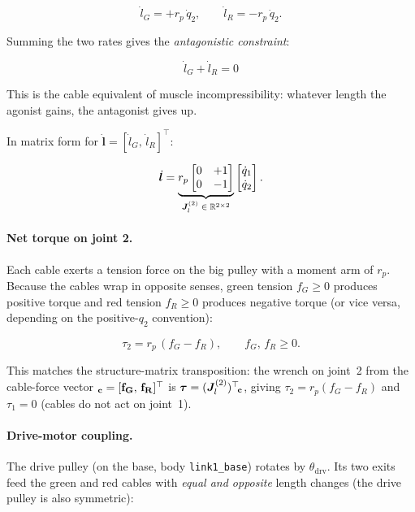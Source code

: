 \documentclass[12pt, a4paper]{article}
\theoremstyle{definition}
\newcommand{\btau}{\bm{\tau}}
\newcommand{\bl}{\bm{l}}
\begin{document}
\begin{equation}
  \label{eq:ldot_pair}
  \dot{l}_G = +r_p\,\dot{q}_2,
  \qquad
  \dot{l}_R = -r_p\,\dot{q}_2.
\end{equation}

Summing the two rates gives the \emph{antagonistic constraint}:

\begin{equation}
  \label{eq:antag_constraint}
  \boxed{\dot{l}_G + \dot{l}_R = 0}
\end{equation}

This is the cable equivalent of muscle incompressibility: whatever length the
agonist gains, the antagonist gives up.

In matrix form for $\dot{\bl} = [\dot{l}_G,\,\dot{l}_R]^\top$:

\begin{equation}
  \label{eq:Jl_pair}
  \dot{\bl}
  =
  \underbrace{%
    r_p
    \begin{bmatrix} 0 & +1 \\ 0 & -1 \end{bmatrix}
  }_{\bm{J}_l^{(2)} \;\in\;\mathbb{R}^{2\times 2}}
  \begin{bmatrix} \dot{q}_1 \\ \dot{q}_2 \end{bmatrix}.
\end{equation}

\paragraph{Net torque on joint 2.}
Each cable exerts a tension force on the big pulley with a moment arm of $r_p$.
Because the cables wrap in opposite senses, green tension $f_G \ge 0$ produces
positive torque and red tension $f_R \ge 0$ produces negative torque (or vice
versa, depending on the positive-$q_2$ convention):

\begin{equation}
  \label{eq:tau2_pair}
  \boxed{
    \tau_2 = r_p\,(f_G - f_R),
    \qquad f_G,\,f_R \ge 0 .
  }
\end{equation}

This matches the structure-matrix transposition: the wrench on joint~2 from the
cable-force vector $\bf_c = [f_G,\,f_R]^\top$ is $\btau = (\bm{J}_l^{(2)})^\top\!\bf_c$,
giving $\tau_2 = r_p(f_G - f_R)$ and $\tau_1 = 0$ (cables do not act on joint~1).

\paragraph{Drive-motor coupling.}
The drive pulley (on the base, body \texttt{link1\_base}) rotates by
$\theta_{\mathrm{drv}}$.  Its two exits feed the green and red cables with
\emph{equal and opposite} length changes (the drive pulley is also symmetric):
\end{document}
